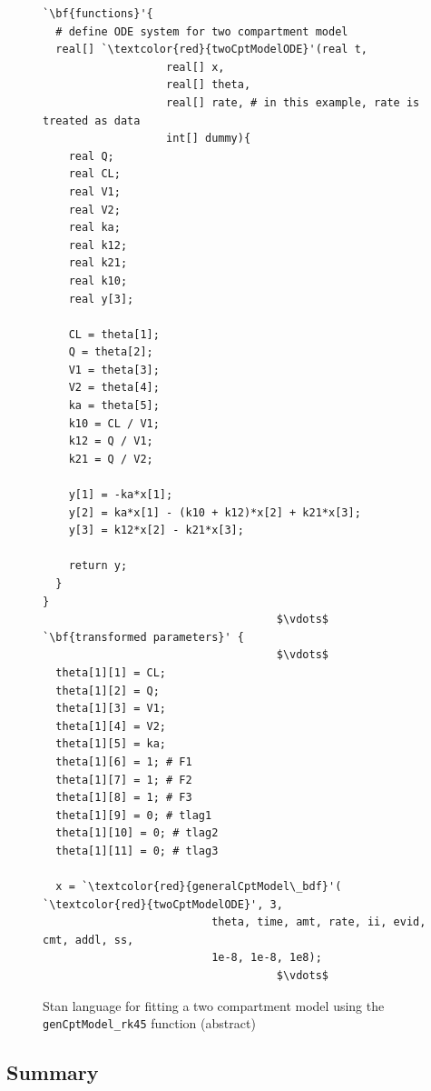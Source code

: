 \documentclass[11pt]{amsart}
\newenvironment{fmpage}[1]
     {\begin{lrbox}{\fmbox}\begin{minipage}{#1}}
     {\end{minipage}\end{lrbox}\fbox{\usebox{\fmbox}}}
\begin{document}
\begin{figure}
\caption{Stan language for fitting a two compartment model using the \texttt{genCptModel\_rk45} function (abstract)}
\begin{center}
\begin{small}
\begin{fmpage}{\textwidth - .75in}
\begin{lstlisting}[basicstyle=\footnotesize\ttfamily,mathescape=true,flexiblecolumns=true,frame=single,escapeinside=`']
`\bf{functions}'{
  # define ODE system for two compartment model
  real[] `\textcolor{red}{twoCptModelODE}'(real t,
			       real[] x,
			       real[] theta,
			       real[] rate, # in this example, rate is treated as data
			       int[] dummy){
    real Q;
    real CL;
    real V1;
    real V2;
    real ka;
    real k12;
    real k21;
    real k10;
    real y[3]; 
    
    CL = theta[1];
    Q = theta[2];
    V1 = theta[3];
    V2 = theta[4];
    ka = theta[5];
    k10 = CL / V1;
    k12 = Q / V1;
    k21 = Q / V2;

    y[1] = -ka*x[1];
    y[2] = ka*x[1] - (k10 + k12)*x[2] + k21*x[3];
    y[3] = k12*x[2] - k21*x[3];

    return y;
  }
}
                                    $\vdots$
`\bf{transformed parameters}' {
                                    $\vdots$
  theta[1][1] = CL;
  theta[1][2] = Q;
  theta[1][3] = V1;
  theta[1][4] = V2;
  theta[1][5] = ka;
  theta[1][6] = 1; # F1
  theta[1][7] = 1; # F2
  theta[1][8] = 1; # F3
  theta[1][9] = 0; # tlag1
  theta[1][10] = 0; # tlag2
  theta[1][11] = 0; # tlag3

  x = `\textcolor{red}{generalCptModel\_bdf}'( `\textcolor{red}{twoCptModelODE}', 3,
                          theta, time, amt, rate, ii, evid, cmt, addl, ss,
                          1e-8, 1e-8, 1e8);
                                    $\vdots$
\end{lstlisting}
\end{fmpage}
\end{small}
\end{center}
\label{GenTwoCptModelCode}
\end{figure}

\subsection*{Summary}
\end{document}
